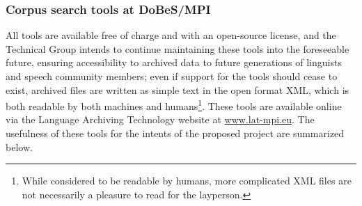 \documentclass[a4paper,12pt]{article}
\begin{document}
\subsubsection{Corpus search tools at DoBeS/MPI}\label{dobesTools}
All tools are available free of charge and with an open-source license, and the Technical Group intends to continue maintaining these tools into the foreseeable future, ensuring accessibility to archived data to future generations of linguists and speech community members; even if support for the tools should cease to exist, archived files are written as simple text in the open format XML, which is both readable by both machines and humans\footnote{While considered to be readable by humans, more complicated XML files are not necessarily a pleasure to read for the layperson.}. These tools are available online via the Language Archiving Technology website at \url{www.lat-mpi.eu}. The usefulness of these tools for the intents of the proposed project are summarized below.
\end{document}
